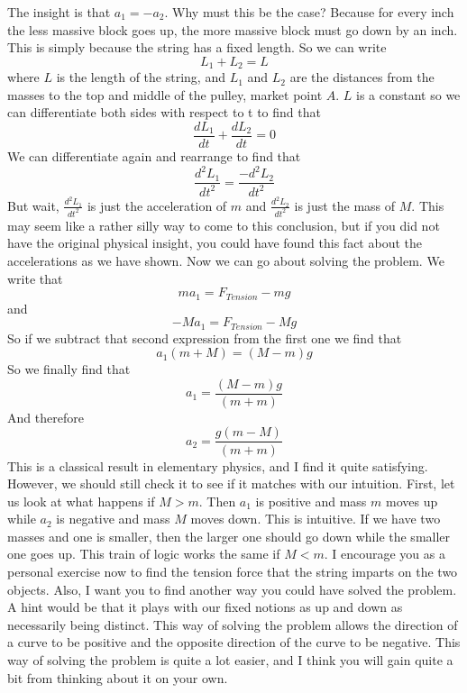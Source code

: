 The insight is that $a_1=-a_2$. Why must this be the case? Because for every inch the less massive block goes up, the more massive block must go down by an inch. This is simply because the string has a fixed length. So we can write \begin{equation}L_1+L_2=L\end{equation}where $L$ is the length of the string, and $L_1$ and $L_2$ are the distances from the masses to the top and middle of the pulley, market point $A$. $L$ is a constant so we can differentiate both sides with respect to t to find that \begin{equation}\frac{dL_1}{dt}+\frac{dL_2}{dt}=0\end{equation} We can differentiate again and rearrange to find that \begin{equation}\frac{d^2L_1}{dt^2}=\frac{-d^2L_2}{dt^2}\end{equation} But wait, $\frac{d^2L_1}{dt^2}$ is just the acceleration of $m$ and $\frac{d^2L_2}{dt^2}$ is just the mass of $M$. This may seem like a rather silly way to come to this conclusion, but if you did not have the original physical insight, you could have found this fact about the accelerations as we have shown. Now we can go about solving the problem. We write that $$ma_1=F_{Tension}-mg$$ and \begin{equation}-Ma_1=F_{Tension}-Mg\end{equation} So if we subtract that second expression from the first one we find that \begin{equation}a_1\left(m+M\right)=\left(M-m\right)g\end{equation} So we finally find that $$a_1=\frac{\left(M-m\right)g}{\left(m+m\right)}$$ And therefore $$a_2=\frac{g \left (m-M\right)}{\left(m+m\right)}$$ This is a classical result in elementary physics, and I find it quite satisfying. However, we should still check it to see if it matches with our intuition. First, let us look at what happens if $M>m$. Then $a_1$ is positive and mass $m$ moves up while $a_2$ is negative and mass $M$ moves down. This is intuitive. If we have two masses and one is smaller, then the larger one should go down while the smaller one goes up. This train of logic works the same if $M<m$. I encourage you as a personal exercise now to find the tension force that the string imparts on the two objects. Also, I want you to find another way you could have solved the problem. A hint would be that it plays with our fixed notions as up and down as necessarily being distinct. This way of solving the problem allows the direction of a curve to be positive and the opposite direction of the curve to be negative. This way of solving the problem is quite a lot easier, and I think you will gain quite a bit from thinking about it on your own. 
\clearpage